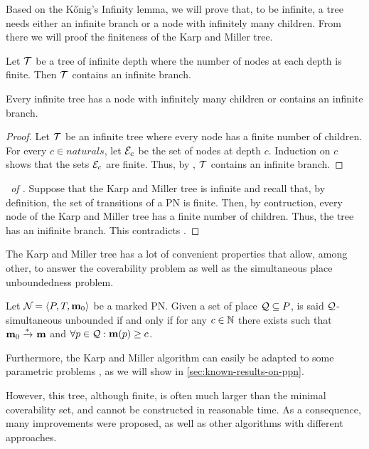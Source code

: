 Based on the Kőnig's Infinity lemma, we will prove that, to be infinite, a tree needs either an infinite branch or a node with infinitely many children.
From there we will proof the finiteness of the Karp and Miller tree.

\begin{lemm}
	\label{theo:konig}
	Let $\mathcal{T}$ be a tree of infinite depth where the number of nodes at each depth is finite.
	Then $\mathcal{T}$ contains an infinite branch.
\end{lemm}

\begin{lemm}
  \label{theo:false-konig}
  Every infinite tree has a node with infinitely many children or contains an infinite branch.
\end{lemm}

\begin{proof}%
  Let $\mathcal{T}$ be an infinite tree where every node has a finite number of children.
  For every $c \in naturals$, let $\mathcal{E}_c$ be the set of nodes at depth $c$.
	Induction on $c$ shows that the sets $\mathcal{E}_c$ are finite.
	Thus, by , $\mathcal{T}$ contains an infinite branch.
\end{proof}

\begin{proof}[\proofname\ of ]
  Suppose that the Karp and Miller tree is infinite
  and recall that, by definition, the set of transitions of a PN is finite.
	Then, by contruction, every node of the Karp and Miller tree has a finite number of children.
  Thus, the tree has an inifinite branch.
  This contradicts .
\end{proof}

 
The Karp and Miller tree has a lot of convenient properties that allow, among other, to answer the coverability problem as well as the simultaneous place unboundedness problem.

\begin{defi}
  Let $\defPN$ be a marked \ac{PN}.
  Given a set of place $\mathcal{Q} \subseteq P$, \namePN is said $\mathcal{Q}$-simultaneous unbounded if and only if for any $c \in \mathbb{N}$ there exists \mar such that $\mathbf{m}_0 \xrightarrow{*}_{} \mathbf{m}$ and $\forall p \in \mathcal{Q} : \mathbf{m}(p) \geq c$.
\end{defi}

Furthermore, the Karp and Miller algorithm can easily be adapted to some parametric problems \cite{David17}, as we will show in \autoref{sec:known-results-on-ppn}.

However, this tree, although finite, is often much larger than the minimal coverability set, and cannot be constructed in reasonable time.
As a consequence, many improvements were proposed, as well as other algorithms with different approaches.
